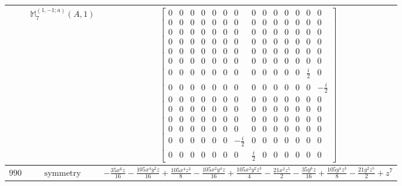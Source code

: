 \documentclass[fleqn,8pt,landscape]{jsarticle}
\begin{document}
\begin{longtable}{ccc}
$  $ & $ \mathbb{M}_{7}^{(1,-1;a)}(A,1) $ & $ \begin{bmatrix} 0 & 0 & 0 & 0 & 0 & 0 & 0 & 0 & 0 & 0 & 0 & 0 & 0 & 0 \\ 0 & 0 & 0 & 0 & 0 & 0 & 0 & 0 & 0 & 0 & 0 & 0 & 0 & 0 \\ 0 & 0 & 0 & 0 & 0 & 0 & 0 & 0 & 0 & 0 & 0 & 0 & 0 & 0 \\ 0 & 0 & 0 & 0 & 0 & 0 & 0 & 0 & 0 & 0 & 0 & 0 & 0 & 0 \\ 0 & 0 & 0 & 0 & 0 & 0 & 0 & 0 & 0 & 0 & 0 & 0 & 0 & 0 \\ 0 & 0 & 0 & 0 & 0 & 0 & 0 & 0 & 0 & 0 & 0 & 0 & 0 & 0 \\ 0 & 0 & 0 & 0 & 0 & 0 & 0 & 0 & 0 & 0 & 0 & 0 & \frac{i}{2} & 0 \\ 0 & 0 & 0 & 0 & 0 & 0 & 0 & 0 & 0 & 0 & 0 & 0 & 0 & - \frac{i}{2} \\ 0 & 0 & 0 & 0 & 0 & 0 & 0 & 0 & 0 & 0 & 0 & 0 & 0 & 0 \\ 0 & 0 & 0 & 0 & 0 & 0 & 0 & 0 & 0 & 0 & 0 & 0 & 0 & 0 \\ 0 & 0 & 0 & 0 & 0 & 0 & 0 & 0 & 0 & 0 & 0 & 0 & 0 & 0 \\ 0 & 0 & 0 & 0 & 0 & 0 & 0 & 0 & 0 & 0 & 0 & 0 & 0 & 0 \\ 0 & 0 & 0 & 0 & 0 & 0 & - \frac{i}{2} & 0 & 0 & 0 & 0 & 0 & 0 & 0 \\ 0 & 0 & 0 & 0 & 0 & 0 & 0 & \frac{i}{2} & 0 & 0 & 0 & 0 & 0 & 0 \end{bmatrix} $ \\ \hline
$ 990 $ & $ \text{symmetry} $ & $ - \frac{35 x^{6} z}{16} - \frac{105 x^{4} y^{2} z}{16} + \frac{105 x^{4} z^{3}}{8} - \frac{105 x^{2} y^{4} z}{16} + \frac{105 x^{2} y^{2} z^{3}}{4} - \frac{21 x^{2} z^{5}}{2} - \frac{35 y^{6} z}{16} + \frac{105 y^{4} z^{3}}{8} - \frac{21 y^{2} z^{5}}{2} + z^{7} $ \\

\end{longtable}
\end{document}
